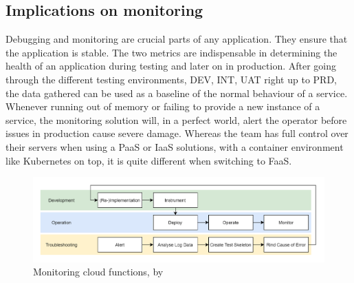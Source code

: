 \documentclass[11pt]{article}
\begin{document}
\subsection{Implications on monitoring}
Debugging and monitoring are crucial parts of any application. They ensure that the application is stable. The two metrics are indispensable in determining the health of an application during testing and later on in production. After going through the different testing environments, DEV, INT, UAT right up to PRD, the data gathered can be used as a baseline of the normal behaviour of a service. Whenever running out of memory or failing to provide a new instance of a service, the monitoring solution will, in a perfect world, alert the operator before issues in production cause severe damage. Whereas the team has full control over their servers when using a PaaS or IaaS solutions, with a container environment like Kubernetes on top, it is quite different when switching to FaaS.
\begin{figure}[H]
\caption{Monitoring cloud functions, by \cite{manner2019troubleshooting}}
\label{fig:manner}
\centering
\includegraphics[width=1\textwidth]{monitoring}
\end{figure}
\end{document}
